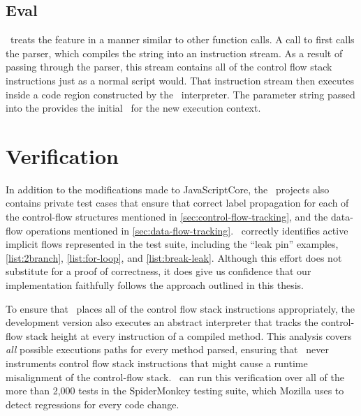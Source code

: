 \subsection{Eval}
\label{sec:eval}
\FlowCore\ treats the  feature in a manner similar to other function calls.
A call to  first calls the parser, which compiles the string into an instruction stream.
As a result of passing through the parser, this stream contains all of the control flow stack instructions just as a normal script would.
That instruction stream then executes inside a code region constructed by the \FlowCore\ interpreter.
The parameter string passed into the  provides the initial \pclabel\ for the new execution context.

\section{Verification}

In addition to the modifications made to JavaScriptCore, the \FlowCore\ projects also contains private test cases that ensure that correct label propagation for each of the control-flow structures mentioned in \autoref{sec:control-flow-tracking}, and the data-flow operations mentioned in \autoref{sec:data-flow-tracking}.
\FlowCore\ correctly identifies active implicit flows represented in the test suite, including the ``leak pin'' examples, \autoref{list:2branch}, \autoref{list:for-loop}, and \autoref{list:break-leak}.
Although this effort does not substitute for a proof of correctness, it does give us confidence that our implementation faithfully follows the approach outlined in this thesis.

To ensure that \FlowCore\ places all of the control flow stack instructions appropriately, the development version also executes an abstract interpreter that tracks the control-flow stack height at every instruction of a compiled method.
This analysis covers \emph{all} possible executions paths for every method parsed, ensuring that \FlowCore\ never instruments control flow stack instructions that might cause a runtime misalignment of the control-flow stack.
\FlowCore\ can run this verification over all of the more than 2,000 tests in the SpiderMonkey testing suite, which Mozilla uses to detect regressions for every code change.


